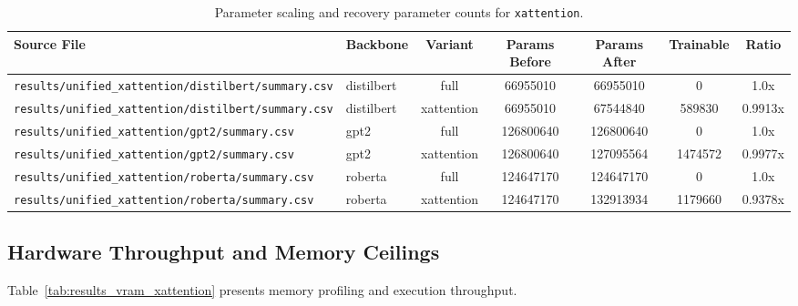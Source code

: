 \begin{table}[t]
\centering
\small
\begin{tabular}{llccccc}
\toprule
\textbf{Source File} & \textbf{Backbone} & \textbf{Variant} & \textbf{Params Before} & \textbf{Params After} & \textbf{Trainable} & \textbf{Ratio} \\
\midrule
\texttt{results/unified\_xattention/distilbert/summary.csv} & distilbert & full & 66955010 & 66955010 & 0 & 1.0x \\
\texttt{results/unified\_xattention/distilbert/summary.csv} & distilbert & xattention & 66955010 & 67544840 & 589830 & 0.9913x \\
\texttt{results/unified\_xattention/gpt2/summary.csv} & gpt2 & full & 126800640 & 126800640 & 0 & 1.0x \\
\texttt{results/unified\_xattention/gpt2/summary.csv} & gpt2 & xattention & 126800640 & 127095564 & 1474572 & 0.9977x \\
\texttt{results/unified\_xattention/roberta/summary.csv} & roberta & full & 124647170 & 124647170 & 0 & 1.0x \\
\texttt{results/unified\_xattention/roberta/summary.csv} & roberta & xattention & 124647170 & 132913934 & 1179660 & 0.9378x \\
\bottomrule
\end{tabular}
\caption{Parameter scaling and recovery parameter counts for \texttt{xattention}.}
\label{tab:results_params_xattention}
\end{table}

\subsection{Hardware Throughput and Memory Ceilings}
Table~\ref{tab:results_vram_xattention} presents memory profiling and execution throughput.

